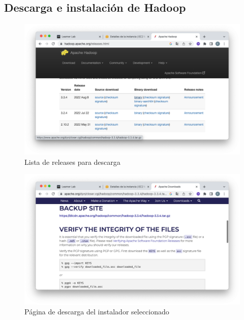 \clearpage

\subsection{Descarga e instalación de Hadoop}
\begin{figure}[h]
	\centering
	\includegraphics[scale=.35] {img/16-webpageHadoop}
	\caption{Lista de releases para descarga}
	\label{fig:16}	
\end{figure}

\begin{figure}[h]
	\centering
	\includegraphics[scale=.35] {img/17-hadoop-tar-gz}
	\caption{Página de descarga del instalador seleccionado}
	\label{fig:17}
\end{figure}

\clearpage

